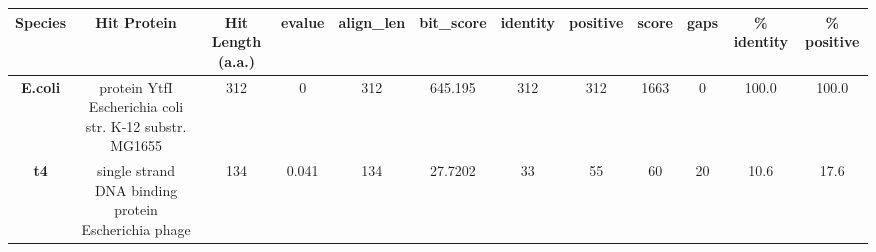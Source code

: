 \begin{tabular}{|c|c|c|c|c|c|c|c|c|c|c|c|} \hline
\textbf{Species} & \textbf{Hit Protein} & \textbf{Hit Length (a.a.)} & \textbf{evalue} & \textbf{align\_len} & \textbf{bit\_score} & \textbf{identity} & \textbf{positive} & \textbf{score} & \textbf{gaps} & \textbf{\% identity} & \textbf{\% positive} \\ \hline
\textbf{E.coli} & protein YtfI Escherichia coli str. K-12 substr. MG1655 & 312 & 0 & 312 & 645.195 & 312 & 312 & 1663 & 0 & 100.0 & 100.0\\
\textbf{t4} & single strand DNA binding protein Escherichia phage  & 134 & 0.041 & 134 & 27.7202 & 33 & 55 & 60 & 20 & 10.6 & 17.6\\
\hline \end{tabular}
